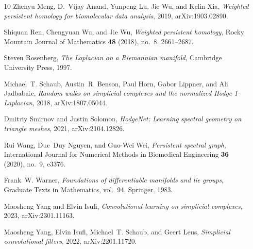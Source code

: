 \documentclass[11pt]{amsart}
\theoremstyle{plain}
\begin{document}
\begin{thebibliography}{10}
Zhenyu Meng, D.~Vijay Anand, Yunpeng Lu, Jie Wu, and Kelin Xia, \emph{Weighted
  persistent homology for biomolecular data analysis}, 2019, arXiv:1903.02890.

Shiquan Ren, Chengyuan Wu, and Jie Wu, \emph{Weighted persistent homology},
  Rocky Mountain Journal of Mathematics \textbf{48} (2018), no.~8, 2661--2687.

Steven Rosenberg, \emph{The {L}aplacian on a {R}iemannian manifold}, Cambridge
  University Press, 1997.

Michael~T. Schaub, Austin~R. Benson, Paul Horn, Gabor Lippner, and Ali
  Jadbabaie, \emph{Random walks on simplicial complexes and the normalized
  {H}odge 1-{L}aplacian}, 2018, arXiv:1807.05044.

Dmitriy Smirnov and Justin Solomon, \emph{{HodgeNet}: Learning spectral
  geometry on triangle meshes}, 2021, arXiv:2104.12826.

Rui Wang, Duc~Duy Nguyen, and Guo-Wei Wei, \emph{Persistent spectral graph},
  International Journal for Numerical Methods in Biomedical Engineering
  \textbf{36} (2020), no.~9, e3376.

Frank~W. Warner, \emph{Foundations of differentiable manifolds and lie groups},
  Graduate Texts in Mathematics, vol.~94, Springer, 1983.

Maosheng Yang and Elvin Isufi, \emph{Convolutional learning on simplicial
  complexes}, 2023, arXiv:2301.11163.

Maosheng Yang, Elvin Isufi, Michael~T. Schaub, and Geert Leus, \emph{Simplicial
  convolutional filters}, 2022, arXiv:2201.11720.

\end{thebibliography}
\end{document}
